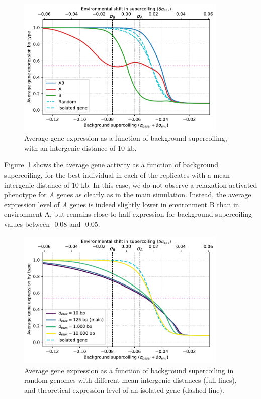 \begin{figure}
\centering
\includegraphics[width=0.9\textwidth]{param/mean-intergene/inter-10k/activity_sigmas_avg.pdf}
\caption[Average gene expression as a function of background supercoiling, with an intergenic distance of 10 kb]{Average gene expression as a function of background supercoiling, with an intergenic distance of 10 kb.}
\label{fig:param:mean-intergene-10kb-activ-by-sigma}
\end{figure}

Figure~\ref{fig:param:mean-intergene-10kb-activ-by-sigma} shows the average gene activity as a function of background supercoiling, for the best individual in each of the replicates with a mean intergenic distance of 10 kb.
In this case, we do not observe a relaxation-activated phenotype for \emph{A} genes as clearly as in the main simulation.
Instead, the average expression level of \emph{A} genes is indeed slightly lower in environment B than in environment A, but remains close to half expression for background supercoiling values between -0.08 and -0.05.


\begin{figure}
\centering
\includegraphics[width=0.9\textwidth]{param/mean-intergene/random_activ_per_sigma.pdf}
\caption[Average gene expression as a function of background supercoiling, with increasing mean intergenic distances, in random genomes]{Average gene expression as a function of background supercoiling in random genomes with different mean intergenic distances (full lines), and theoretical expression level of an isolated gene (dashed line).}
\label{fig:param:mean-intergene-random-activ-by-sigma}
\end{figure}

